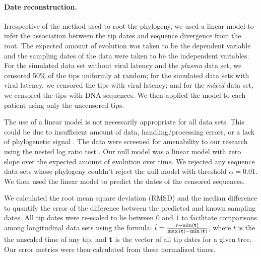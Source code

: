 \documentclass[12pt]{article}
\begin{document}
\paragraph * {Date reconstruction.} \label{subsec:daterecon}

Irrespective of the method used to root the phylogeny, we used a linear model to infer the association between the tip dates and sequence divergence from the root. 
The expected amount of evolution was taken to be the dependent variable and the sampling dates of the data were taken to be the independent variables.
For the simulated data set without viral latency and the \emph{plasma} data set, we censored 50\% of the tips uniformly at random; for the simulated data sets with viral latency, we censored the tips with viral latency; and for the \emph{mixed} data set, we censored the tips with DNA sequences.
We then applied the model to each patient using only the uncensored tips.

The use of a linear model is not necessarily appropriate for all data sets.
This could be due to insufficient amount of data, handling/processing errors, or a lack of phylogenetic signal \citep{Tempest}.
The data were screened for amenability to our research using the nested log ratio test \citep{Ho14}. 
Our null model was a linear model with zero slope over the expected amount of evolution over time.
We rejected any sequence data sets whose phylogeny couldn't reject the null model with threshold $\alpha=0.01$.
We then used the linear model to predict the dates of the censored sequences.

We calculated the root mean square deviation (RMSD) and the median difference to quantify the error of the difference between the predicted and known sampling dates.
All tip dates were re-scaled to lie between $0$ and $1$ to facilitate comparisons among longitudinal data sets using the formula: $\hat{t} = \frac{t - \min(\bf{t}) }{ \max{(\bf{t})} - \min{(\bf{t}})}$, where $t$ is the the unscaled time of any tip, and $\bf{t}$ is the vector of all tip dates for a given tree. 
Our error metrics were then calculated from these normalized times.%
\end{document}
